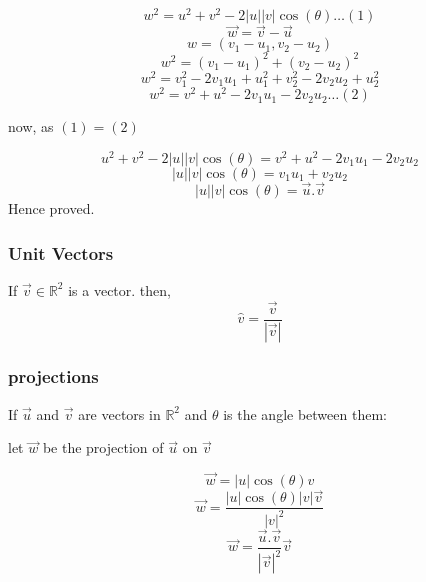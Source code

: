 \documentclass{article}
\begin{document}
$$ w^2 = u^2 + v^2 - 2|u||v| \cos(\theta) \dots(1)$$
$$\vec{w} = \vec{v} - \vec{u}$$
$$ w = (v_1 - u_1, v_2 - u_2)$$
$$ w^2 = (v_1 - u_1)^2 + (v_2 - u_2)^2$$
$$ w^2 = v_1^2 - 2v_1u_1 + u_1^2 + v_2^2 - 2v_2u_2 + u_2^2$$
$$ w^2 = v^2 + u^2 - 2v_1u_1 - 2v_2u_2 \dots (2)$$

now, as $(1) = (2)$

$$ u^2 + v^2 - 2|u||v| \cos(\theta) = v^2 + u^2 - 2v_1u_1 - 2v_2u_2$$
$$|u||v| \cos(\theta) = v_1u_1 + v_2u_2$$
$$|u||v| \cos(\theta) = \vec{u}.\vec{v}$$
Hence proved.

\subsubsection*{Unit Vectors}
If $\vec{v} \in \mathbb{R}^2$ is a vector.
then, $$\hat{v} = \frac{\vec{v}}{|\vec{v}|}$$

\subsubsection*{projections}
If $\vec{u}$ and $\vec{v}$ are vectors in $\mathbb{R}^2$ and $\theta$ is the angle between them:


let $\vec{w}$ be the projection of $\vec{u}$ on $\vec{v}$

$$\vec{w} = |u| \cos(\theta) \hat{v}$$
$$\vec{w} = \frac{|u| \cos(\theta)|v|\vec{v} }{|v|^2}$$
$$\vec{w} = \frac{\vec{u}.\vec{v}}{|\vec{v}|^2} \vec{v}$$
\end{document}
